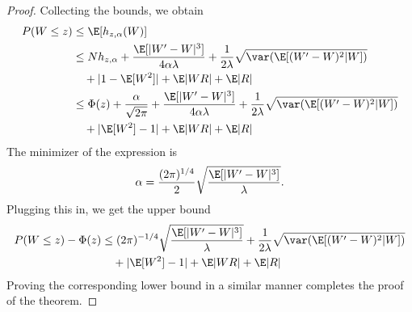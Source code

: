\begin{proof}
  Collecting the bounds, we obtain
  \begin{equation}
    \begin{split}
      P(W \leq z) &\leq \E [h_{z,\alpha}(W)] \\
      &\leq Nh_{z,\alpha} + \frac{\E [|W'-W|^3]}{4 \alpha \lambda}
      + \frac{1}{2\lambda} \sqrt{\var (\E [(W'-W)^2|W])} \\
      &\quad + |1 - \E [W^2]| + \E |WR| + \E |R| \\
      &\leq \Phi (z) + \frac{\alpha}{\sqrt{2\pi}} + \frac{\E [|W'-W|^3]}{4 \alpha \lambda}
      + \frac{1}{2\lambda} \sqrt{\var (\E [(W'-W)^2|W])} \\
      &\quad + |\E [W^2] - 1| + \E |WR| + \E |R|
    \end{split}
  \end{equation}
  The minimizer of the expression is
  \begin{equation}
    \alpha = \frac{(2\pi)^{1/4}}{2}\sqrt{\frac{\E [|W'-W|^3]}{\lambda}}.
  \end{equation}
  Plugging this in, we get the upper bound
  \begin{equation}
    \begin{split}
      P(W \leq z) - \Phi(z) &\leq (2\pi)^{-1/4} \sqrt{\frac{\E [|W'-W|^3]}{\lambda}}
      + \frac{1}{2\lambda} \sqrt{\var (\E [(W'-W)^2|W])} \\
      &\quad + |\E [W^2] - 1| + \E |WR| + \E |R|
    \end{split}
  \end{equation}
  Proving the corresponding lower bound in a similar manner completes the proof of the theorem.
\end{proof}